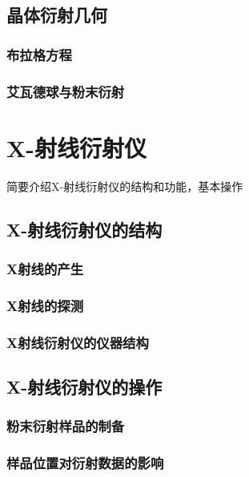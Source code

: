 \documentclass[12pt,a4paper,twoside]{ctexart}
\newcommand{\smtext}[1]{{\fontsize{9.3pt}{12pt}\selectfont #1}}
\begin{document}
\subsection{晶体衍射几何}

\subsubsection{布拉格方程}

\subsubsection{艾瓦德球与粉末衍射}

\section{X-射线衍射仪}

\smtext{简要介绍X-射线衍射仪的结构和功能，基本操作}

\subsection{X-射线衍射仪的结构}

\subsubsection{X射线的产生}

\subsubsection{X射线的探测}

\subsubsection{X射线衍射仪的仪器结构}

\subsection{X-射线衍射仪的操作}

\subsubsection{粉末衍射样品的制备}

\subsubsection{样品位置对衍射数据的影响}
\end{document}

